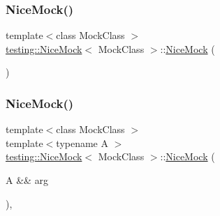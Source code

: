\subsubsection{\texorpdfstring{NiceMock()}{NiceMock()}\hspace{0.1cm}{\footnotesize\ttfamily [4/17]}}
{\footnotesize\ttfamily template$<$class Mock\+Class $>$ \\
\mbox{\hyperlink{classtesting_1_1_nice_mock}{testing\+::\+Nice\+Mock}}$<$ Mock\+Class $>$\+::\mbox{\hyperlink{classtesting_1_1_nice_mock}{Nice\+Mock}} (\begin{DoxyParamCaption}{ }\end{DoxyParamCaption})\hspace{0.3cm}{\ttfamily [inline]}}

\mbox{\label{classtesting_1_1_nice_mock_a63f2d3b2af1c725036df39367c90fe6d}} 
\subsubsection{\texorpdfstring{NiceMock()}{NiceMock()}\hspace{0.1cm}{\footnotesize\ttfamily [5/17]}}
{\footnotesize\ttfamily template$<$class Mock\+Class $>$ \\
template$<$typename A $>$ \\
\mbox{\hyperlink{classtesting_1_1_nice_mock}{testing\+::\+Nice\+Mock}}$<$ Mock\+Class $>$\+::\mbox{\hyperlink{classtesting_1_1_nice_mock}{Nice\+Mock}} (\begin{DoxyParamCaption}\item[{A \&\&}]{arg }\end{DoxyParamCaption})\hspace{0.3cm}{\ttfamily [inline]}, {\ttfamily [explicit]}}

\mbox{\label{classtesting_1_1_nice_mock_a8d9f38b501fbbf1179f139451d29dd78}} 
